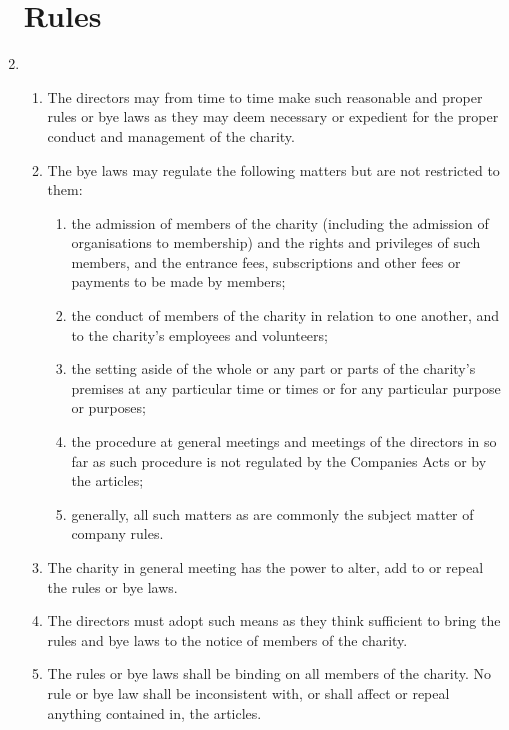 \documentclass{article}
\begin{document}
\begin{enumerate}[label=\arabic*, start=23]
    \section{Rules}
    \item \begin{enumerate}[label=(\arabic*)]
        \item The directors may from time to time make such reasonable and
        proper rules or bye laws as they may deem necessary
        or expedient for the proper conduct and management of
        the charity.
        \item The bye laws may regulate the following matters but are not
        restricted to them:
        \begin{enumerate}[label=(\alph*)]
            \item the admission of members of the charity (including the
            admission of organisations to membership) and the
            rights and privileges of such members, and the entrance
            fees, subscriptions and other fees or payments to be
            made by members;
            \item the conduct of members of the charity in relation to one
            another, and to the charity's employees and volunteers;
            \item the setting aside of the whole or any part or parts of the
            charity's premises at any particular time or times or for
            any particular purpose or purposes;
            \item the procedure at general meetings and meetings of the
            directors in so far as such procedure is not regulated by
            the Companies Acts or by the articles;
            \item generally, all such matters as are commonly the subject
            matter of company rules.
        \end{enumerate}
        \item The charity in general meeting has the power to alter, add to or
        repeal the rules or bye laws.
        \item The directors must adopt such means as they think sufficient
        to bring the rules and bye laws to the notice of members of
        the charity.
        \item The rules or bye laws shall be binding on all members of the
        charity. No rule or bye law shall be inconsistent with, or shall
        affect or repeal anything contained in, the articles.
    \end{enumerate}
    

\end{enumerate}
\end{document}
